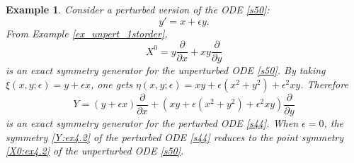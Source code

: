 \documentclass[11pt,letter,subeqn]{article}
\newtheorem{example}{Example}[section]
\begin{document}
\begin{example}
Consider a perturbed version of the ODE \eqref{s50}:
\begin{equation}\label{s44}
y'=x+\epsilon y.
\end{equation}
From Example \ref{ex_unpert_1storder},
\begin{equation}\label{X0:ex4.2}
X^0=y\dfrac{\partial}{\partial x}+ xy \dfrac{\partial}{\partial y}
\end{equation}
is an exact symmetry generator for the unperturbed ODE \eqref{s50}. By taking\, $\xi(x,y;\epsilon)=y+\epsilon x$,
one gets $\eta(x,y;\epsilon)=xy+\epsilon (x^2+y^2)+\epsilon^2 xy$. Therefore
\begin{equation}\label{Y:ex4.2}
Y=(y+\epsilon x)\dfrac{\partial}{\partial x}+ (xy+\epsilon (x^2+y^2)+\epsilon^2 xy) \dfrac{\partial}{\partial y}
\end{equation}
is an exact symmetry generator for the perturbed ODE \eqref{s44}. When $\epsilon=0$, the symmetry \eqref{Y:ex4.2} of the perturbed ODE \eqref{s44} reduces to the point symmetry \eqref{X0:ex4.2} of the unperturbed ODE \eqref{s50}.
\end{example}
\end{document}
